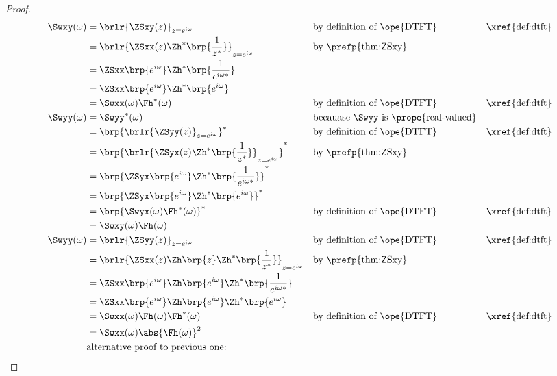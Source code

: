 \begin{proof}
\begin{align*}
   \Swxy(\omega)
     &= \brlr{\ZSxy(z)}_{z=e^{i\omega}}
     && \text{by definition of \ope{DTFT}}
     && \text{\xref{def:dtft}}
   \\&= \brlr{\ZSxx(z)\Zh^\ast\brp{\frac{1}{z^\ast}}}_{z=e^{i\omega}}
     && \text{by \prefp{thm:ZSxy}}
   \\&= \ZSxx\brp{e^{i\omega}}\Zh^\ast\brp{\frac{1}{e^{i\omega\ast}}}
   \\&= \ZSxx\brp{e^{i\omega}}\Zh^\ast\brp{e^{i\omega}}
   \\&= \Swxx(\omega) \Fh^\ast(\omega)
     && \text{by definition of \ope{DTFT}}
     && \text{\xref{def:dtft}}
   \\
   \Swyy(\omega)
     &= \Swyy^\ast(\omega)
     && \text{becauase $\Swyy$ is \prope{real-valued}}
   \\&= \brp{\brlr{\ZSyy(z)}_{z=e^{i\omega}}}^\ast
     && \text{by definition of \ope{DTFT}}
     && \text{\xref{def:dtft}}
   \\&= \brp{\brlr{\ZSyx(z)\Zh^\ast\brp{\frac{1}{z^\ast}}}_{z=e^{i\omega}}}^\ast
     && \text{by \prefp{thm:ZSxy}}
   \\&= \brp{\ZSyx\brp{e^{i\omega}} \Zh^\ast\brp{\frac{1}{e^{i\omega\ast}}}}^\ast
   \\&= \brp{\ZSyx\brp{e^{i\omega}} \Zh^\ast\brp{e^{i\omega}}}^\ast
   \\&= \brp{\Swyx(\omega) \Fh^\ast(\omega)}^\ast
     && \text{by definition of \ope{DTFT}}
     && \text{\xref{def:dtft}}
   \\&= \Swxy(\omega) \Fh(\omega)
   \\
   \Swyy(\omega)
     &= \brlr{\ZSyy(z)}_{z=e^{i\omega}}
     && \text{by definition of \ope{DTFT}}
     && \text{\xref{def:dtft}}
   \\&= \brlr{\ZSxx(z)\Zh\brp{z} \Zh^\ast\brp{\frac{1}{z^\ast}}}_{z=e^{i\omega}}
     && \text{by \prefp{thm:ZSxy}}
   \\&= \ZSxx\brp{e^{i\omega}} \Zh\brp{e^{i\omega}} \Zh^\ast\brp{\frac{1}{e^{i\omega\ast}}}
   \\&= \ZSxx\brp{e^{i\omega}} \Zh\brp{e^{i\omega}} \Zh^\ast\brp{e^{i\omega}}
   \\&= \Swxx(\omega) \Fh(\omega) \Fh^\ast(\omega)
     && \text{by definition of \ope{DTFT}}
     && \text{\xref{def:dtft}}
   \\&= \Swxx(\omega) \abs{\Fh(\omega)}^2
   \\
     &\text{alternative proof to previous one:}

\end{align*}
\end{proof}

